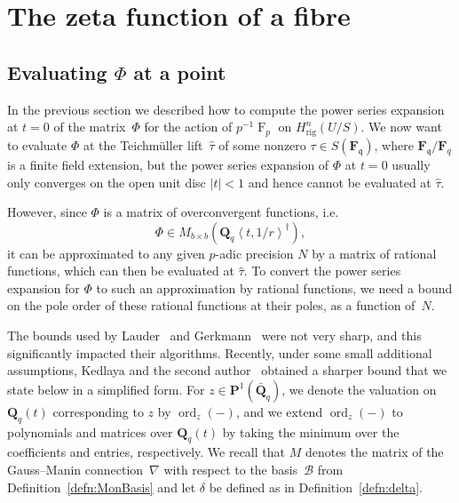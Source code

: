 \documentclass[a4paper,11pt]{article}
\numberwithin{equation}{section}
\providecommand{\abs}[1]{\lvert#1\rvert}                 %
\newcommand{\QQ}{\mathbf{Q}} %
\newcommand{\FF}{\mathbf{F}} %
\DeclareMathOperator{\ord}{ord}          %
\DeclareMathOperator{\Frob}{F}           %
\providecommand{\Hrig}{H_{\text{rig}}}  %
\providecommand{\cB}{\mathcal{B}} %
\theoremstyle{definition}
\begin{document}

\section{The zeta function of a fibre}

\label{sec:ZetaFunctions}

\subsection{Evaluating $\Phi$ at a point}

In the previous section we described how to compute the power series 
expansion at $t=0$ of the matrix~$\Phi$ for the action of $p^{-1} \Frob_p$ on 
$\Hrig^{n}(U/S)$. We now want to evaluate $\Phi$ at the Teichm\"uller 
lift~$\hat{\tau}$ of some nonzero $\tau \in S(\FF_{\mathfrak{q}})$, 
where $\FF_{\mathfrak{q}}/\FF_q$ is a finite field extension, but 
the power series expansion of $\Phi$ 
at $t=0$ usually only converges on the open unit disc $\abs{t} < 1$ 
and hence cannot be evaluated at $\hat{\tau}$. 

However, since $\Phi$ is a matrix of overconvergent functions, i.e.\ 
\[
\Phi \in M_{b \times b}\left(\QQ_q \left\langle t,1/r \right\rangle^{\dag}\right),
\]
it can be approximated to any given $p$-adic precision $N$ by a matrix 
of rational functions, which can then be evaluated at $\hat{\tau}$. To 
convert the power series expansion for $\Phi$ to such an approximation 
by rational functions, we need a bound on the pole order of these 
rational functions at their poles, as a function of~$N$.

The bounds used by Lauder~\citep[\S 8.1]{Lauder2004a} and 
Gerkmann~\citep[\S 6]{Gerkmann2007} were not very sharp, 
and this significantly impacted their algorithms.
Recently, under some small additional assumptions, Kedlaya and the second 
author~\citep[Theorem~2.1]{KedlayaTuitman2012} obtained a sharper bound 
that we state below in a simplified form. For $z \in \mathbf{P}^1(\bar{\QQ}_q)$, we
denote the valuation on $\QQ_q(t)$ corresponding to $z$ by $\ord_z(-)$, and
we extend $\ord_z(-)$ to polynomials and matrices over $\QQ_q(t)$ by
taking the minimum over the coefficients and entries, respectively.
We recall that $M$ denotes the matrix of the Gauss--Manin connection~$\nabla$
with respect to the basis~$\cB$ from Definition~\ref{defn:MonBasis} 
and let $\delta$ be defined as in Definition~\ref{defn:delta}.
\end{document}
